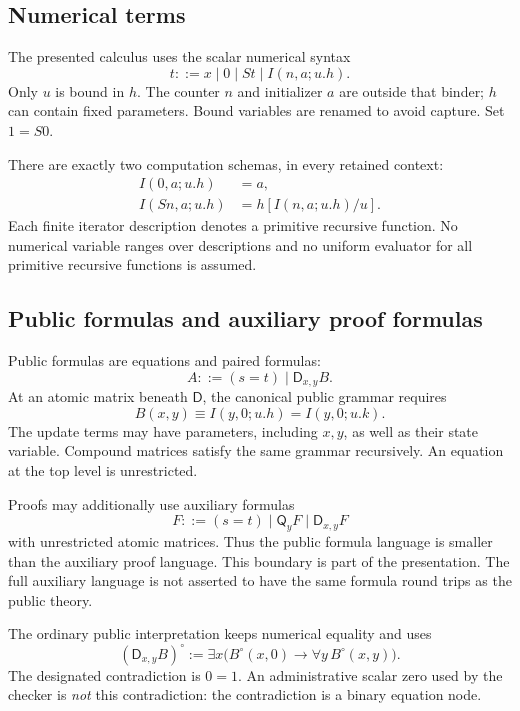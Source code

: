 \documentclass[11pt,letterpaper]{article}
\theoremstyle{definition}
\theoremstyle{remark}
\newcommand{\D}{\mathsf D}
\newcommand{\Q}{\mathsf Q}
\begin{document}
\subsection{Numerical terms}

The presented calculus uses the scalar numerical syntax
\[
 t::=x\mid0\mid St\mid I(n,a;u.h).
\]
Only $u$ is bound in $h$. The counter $n$ and initializer $a$ are outside
that binder; $h$ can contain fixed parameters. Bound variables are
renamed to avoid capture. Set $1=S0$.

There are exactly two computation schemas, in every retained context:
\begin{align}
 I(0,a;u.h)&=a,\tag{I0}\label{eq:i0}\\
 I(Sn,a;u.h)&=h[I(n,a;u.h)/u].\tag{IS}\label{eq:is}
\end{align}
Each finite iterator description denotes a primitive recursive function.
No numerical variable ranges over descriptions and no uniform evaluator
for all primitive recursive functions is assumed.

\subsection{Public formulas and auxiliary proof formulas}

Public formulas are equations and paired formulas:
\[
 A::=(s=t)\mid\D_{x,y}B.
\]
At an atomic matrix beneath $\D$, the canonical public grammar requires
\begin{equation}
 B(x,y)\equiv I(y,0;u.h)=I(y,0;u.k).
 \tag{Guard}\label{eq:guard}
\end{equation}
The update terms may have parameters, including $x,y$, as well as their
state variable. Compound matrices satisfy the same grammar recursively.
An equation at the top level is unrestricted.

Proofs may additionally use auxiliary formulas
\[
 F::=(s=t)\mid\Q_yF\mid\D_{x,y}F
\]
with unrestricted atomic matrices. Thus the public formula language is
smaller than the auxiliary proof language. This boundary is part of the
presentation. The full auxiliary language is not asserted to have the
same formula round trips as the public theory.

The ordinary public interpretation keeps numerical equality and uses
\begin{equation}
 (\D_{x,y}B)^\circ
   :=\exists x\bigl(B^\circ(x,0)\to\forall y\,B^\circ(x,y)\bigr).
 \tag{D}\label{eq:publicD}
\end{equation}
The designated contradiction is $0=1$. An administrative scalar zero
used by the checker is \emph{not} this contradiction: the contradiction
is a binary equation node.
\end{document}
